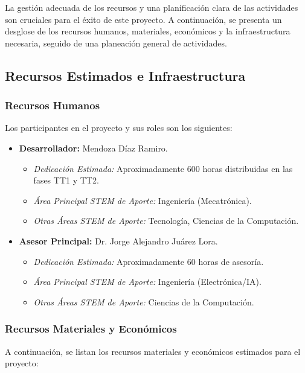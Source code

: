 \documentclass[12pt]{article}
\begin{document}
La gestión adecuada de los recursos y una planificación clara de las actividades son cruciales para el éxito de este proyecto. A continuación, se presenta un desglose de los recursos humanos, materiales, económicos y la infraestructura necesaria, seguido de una planeación general de actividades.

\subsection*{Recursos Estimados e Infraestructura}
\label{ssec:presupuesto_infraestructura_listas}

\subsubsection*{Recursos Humanos}
\label{sssec:recursos_humanos_listas}
Los participantes en el proyecto y sus roles son los siguientes:
\begin{itemize}
    \item \textbf{Desarrollador:} Mendoza Díaz Ramiro.
        \begin{itemize}
            \item \textit{Dedicación Estimada:} Aproximadamente 600 horas distribuidas en las fases TT1 y TT2.
            \item \textit{Área Principal STEM de Aporte:} Ingeniería (Mecatrónica).
            \item \textit{Otras Áreas STEM de Aporte:} Tecnología, Ciencias de la Computación.
        \end{itemize}
    \item \textbf{Asesor Principal:} Dr. Jorge Alejandro Juárez Lora.
        \begin{itemize}
            \item \textit{Dedicación Estimada:} Aproximadamente 60 horas de asesoría.
            \item \textit{Área Principal STEM de Aporte:} Ingeniería (Electrónica/IA).
            \item \textit{Otras Áreas STEM de Aporte:} Ciencias de la Computación.
        \end{itemize}
\end{itemize}


\subsubsection*{Recursos Materiales y Económicos}
\label{sssec:recursos_materiales_economicos_listas}
A continuación, se listan los recursos materiales y económicos estimados para el proyecto:
\end{document}
